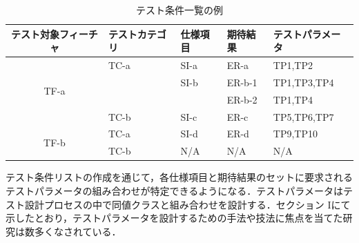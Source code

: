 \documentclass[a4paper,12pt]{jreport}
\begin{document}
\begin{table}[htbp]
  \centering
  \caption{テスト条件一覧の例}
    \begin{tabular}{|c|p{6em}|p{6em}|p{6em}|p{7.145em}|}
    \hline
    \multicolumn{1}{|p{8.855em}|}{\textbf{テスト対象フィーチャ}} & \textbf{テストカテゴリ} & \textbf{仕様項目} & \textbf{期待結果} & \textbf{テストパラメータ} \bigstrut \\
    \hline
    \multicolumn{1}{|c|}{\multirow{4}[8]{*}{TF-a}} & TC-a  & SI-a  & ER-a  & TP1,TP2 \bigstrut\\
\cline{2-5}          & \multicolumn{1}{l|}{} & SI-b  & ER-b-1 & TP1,TP3,TP4 \bigstrut\\
\cline{2-5}          & \multicolumn{1}{l|}{} & \multicolumn{1}{l|}{} & ER-b-2 & TP1,TP4 \bigstrut\\
\cline{2-5}          & TC-b  & SI-c  & ER-c  & TP5,TP6,TP7 \bigstrut\\
    \hline
    \multicolumn{1}{|c|}{\multirow{2}[4]{*}{TF-b}} & TC-a  & SI-d  & ER-d  & TP9,TP10 \bigstrut\\
\cline{2-5}          & TC-b  & N/A   & N/A   & N/A \bigstrut\\
    \hline
    \end{tabular}%
  \label{tbl:D-3-tbl3}%
\end{table}%


テスト条件リストの作成を通じて，各仕様項目と期待結果のセットに要求されるテストパラメータの組み合わせが特定できるようになる．テストパラメータはテスト設計プロセスの中で同値クラスと組み合わせを設計する．セクション Iにて示したとおり，テストパラメータを設計するための手法や技法に焦点を当てた研究は数多くなされている．
\end{document}
